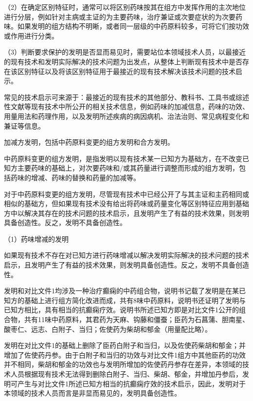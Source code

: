 {\setlength{\parindent}{17.1bp}（2）在确定区别特征时，通常可以将区别药味按其在组方中发挥作用的主次地位进行分层，例如针对主病或主证的为主要药味，治疗兼证或次要症状的为次要药味。如果发明的组方结构不明晰，或者同一层级的中药原料较多，可将它们按功效或作用进行分类。\par}

{\setlength{\parindent}{17.1bp}（3）判断要求保护的发明是否显而易见时，需要站位本领域技术人员，以最接近的现有技术和发明实际解决的技术问题为出发点，从整体上判断现有技术中是否存在该区别特征以及将该区别特征用于最接近的现有技术解决该技术问题的技术启示。\par}

常见的技术启示可来源于：最接近的现有技术的其他部分、教科书、工具书或综述性文献等现有技术中所公开的相关技术信息，例如药味的加减信息，药味的功效、用量用法和药理作用，以及发明所述疾病的病因病机、治法治则、常见病程变化和兼证等信息。

加减方发明，包括中药原料变更的组方发明和合方发明。

中药原料变更的组方发明，是指发明以现有技术某一已知方为基础方，在不改变已知方主要药味的基础上，对次要药味和/或其药量进行调整而形成的组方发明，包括药味的增减、药味的替换和药量的加减等。

对于中药原料变更的组方发明，尽管现有技术中已经公开了与其主证和主药相同或相似的基础方，但如果现有技术没有给出将药味或药量变化等区别特征应用到基础方中以解决其存在的技术问题的技术启示，且发明产生了有益的技术效果，则发明具备创造性。反之，发明不具备创造性。

{\setlength{\parindent}{17.1bp}（1）药味增减的发明\par}

如果现有技术不存在对已知方进行药味增减以解决发明实际解决的技术问题的技术启示，且发明产生了有益的技术效果，则发明具备创造性。反之，发明不具备创造性。

{\par}

发明和对比文件1均涉及一种治疗癫痫的中药组合物，说明书记载了发明是在某已知方的基础上进行组方简化改进而成，共有8味中药原料，说明书还证明了发明与已知方相比，具有相当的抗癫痫疗效。说明书所述已知方即是对比文件1公开的组合物，共有11味中药原料，其君药为天麻、钩藤和僵蚕；臣药为石菖蒲、胆南星、酸枣仁、远志、白附子、当归；佐使药为柴胡和郁金（用量配比略）。

发明在对比文件1的基础上删除了臣药白附子和当归，以及佐使药柴胡和郁金；并增加了佐使药丹参。由于白附子和当归的功效与对比文件1组方中其他臣药的功效并不相同，柴胡和郁金的功效也与发明所增加的佐使药丹参存在差异，本领域的技术人员根据现有技术无法得到删除白附子、当归、柴胡、郁金，并增加丹参后，发明可产生与对比文件1所述已知方相当的抗癫痫疗效的技术启示，因此，发明对于本领域的技术人员而言是非显而易见的，发明具备创造性。

